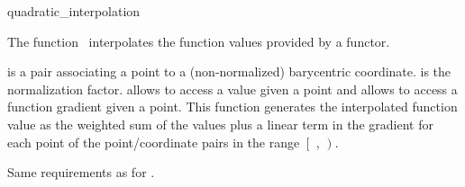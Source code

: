
\begin{ccRefFunction}{quadratic_interpolation}  %

\ccDefinition
  
The function \ccRefName\ interpolates the function values provided by 
a functor.


 {  is a pair
  associating a point to a (non-normalized) barycentric coordinate.
   is the normalization factor.   allows to access a
  value given a point and  allows to access a function gradient
  given a point.  This function generates the interpolated function
  value as the weighted sum of the values plus a linear term in the
  gradient for each point of the point/coordinate pairs in the range
  $\left[\right.$ , $\left.\right)$.
  }


Same requirements as for .

\ccSeeAlso
{} \\


\end{ccRefFunction}


